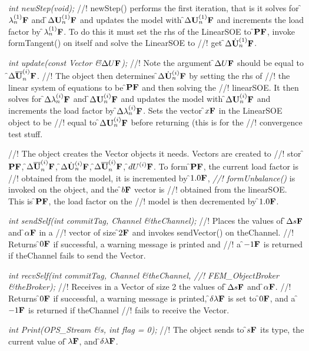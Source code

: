 
{\em int newStep(void);}
//! newStep() performs the first iteration, that is it solves for 
\f$\lambda_n^{(1)}{\bf F}$ and \f$\Delta {\bf U}_n^{(1)}{\bf F}$ and updates the model with
\f$\Delta {\bf U}_n^{(1)}{\bf F}$ and increments the load factor by
\f$\lambda_n^{(1)}{\bf F}$. To do this it must set the rhs of the LinearSOE to
\f${\bf P}{\bf F}$, invoke formTangent() on itself and solve the LinearSOE to
//! get \f$\Delta \dot{\bf U}_n^{(1)}{\bf F}$.

{\em int update(const Vector \&\f$\Delta U{\bf F}$);}
//! Note the argument \f$\Delta U{\bf F}$ should be equal to \f$\Delta \overline{\bf U}_n^{(i)}{\bf F}$.
//! The object then determines \f$\Delta \dot{\bf U}_n^{(i)}{\bf F}$ by setting the rhs of
//! the linear system of equations to be \f${\bf P}{\bf F}$ and then solving the
//! linearSOE. It then solves for
\f$\Delta \lambda_n^{(i)}{\bf F}$ and \f$\Delta {\bf U}_n^{(i)}{\bf F}$ and updates the model with
\f$\Delta {\bf U}_n^{(i)}{\bf F}$ and increments the load factor by \f$\Delta
\lambda_n^{(i)}{\bf F}$. Sets the vector \f$x{\bf F}$ in the LinearSOE object to be
//! equal to \f$\Delta {\bf U}_n^{(i)}{\bf F}$ before returning (this is for the
//! convergence test stuff.


//! The object creates the Vector objects it needs. Vectors are created to
//! stor \f${\bf P}{\bf F}$, \f$\Delta \overline{\bf U}_n^{(i)}{\bf F}$, \f$\Delta \dot{\bf U}_n^{(i)}{\bf F}$, \f$\Delta
\overline{\bf U}_n^{(i)}{\bf F}$, \f$dU^{(i)}{\bf F}$. To form \f${\bf P}{\bf F}$, the current load factor is
//! obtained from the model, it is incremented by \f$1.0{\bf F}$, {\em
//! formUnbalance()} is invoked on the object, and the \f$b{\bf F}$ vector is
//! obtained from the linearSOE. This is \f${\bf P}{\bf F}$, the load factor on the
//! model is then decremented by \f$1.0{\bf F}$.

{\em int sendSelf(int commitTag, Channel \&theChannel); } 
//! Places the values of \f$\Delta s{\bf F}$ and \f$\alpha{\bf F}$ in a
//! vector of size \f$2{\bf F}$ and invokes sendVector() on \p theChannel.
//! Returns \f$0{\bf F}$ if successful, a warning message is printed and
//! a \f$-1{\bf F}$ is returned if \p theChannel fails to send the Vector.

{\em int recvSelf(int commitTag, Channel \&theChannel, 
//! FEM\_ObjectBroker \&theBroker); } 
//! Receives in a Vector of size 2 the values of \f$\Delta s{\bf F}$ and \f$\alpha{\bf F}$.
//! Returns \f$0{\bf F}$ if successful, a warning message is printed, \f$\delta
\lambda{\bf F}$ is set to \f$0{\bf F}$, and a \f$-1{\bf F}$ is returned if \p theChannel
//! fails to receive the Vector.

{\em int Print(OPS\_Stream \&s, int flag = 0);}
//! The object sends to \f$s{\bf F}$ its type, the current value of \f$\lambda{\bf F}$, and
\f$\delta \lambda{\bf F}$. 
